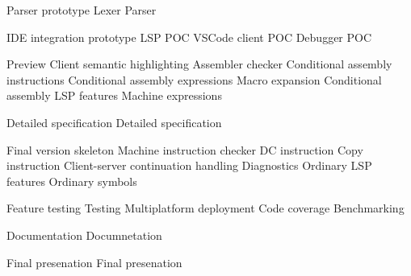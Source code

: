 	\itemm Parser prototype 
		\bwp
			\itemwp Lexer 
			\itemwp Parser 
		\eenum
	
	\itemm IDE integration prototype 
		\bwp
			\itemwp LSP POC 
			\itemwp VSCode client POC 
			\itemwp Debugger POC 
		\eenum
	
	\itemm \label{milestone_preview} Preview 
		\bwp
			\itemwp Client semantic highlighting 
			\itemwp Assembler checker 
			\itemwp Conditional assembly instructions 
			\itemwp Conditional assembly expressions 
			\itemwp Macro expansion 
			\itemwp Conditional assembly LSP features 
			\itemwp Machine expressions 
		\eenum
	
	\itemm Detailed specification 
		\bwp
			\itemwp Detailed specification 
		\eenum
	
	\itemm Final version skeleton 
		\bwp
			\itemwp Machine instruction checker 
			\itemwp DC instruction 
			\itemwp Copy instruction 
			\itemwp Client-server continuation handling 
			\itemwp Diagnostics 
			\itemwp Ordinary LSP features 
			\itemwp Ordinary symbols 
		\eenum
	
	\itemm Feature testing 
		\bwp
			\itemwp Testing 
			\itemwp Multiplatform deployment 
			\itemwp Code coverage 
			\itemwp Benchmarking 
		\eenum
	
	\itemm Documentation 
		\bwp
			\itemwp Documnetation 
		\eenum
	
	\itemm Final presenation 
		\bwp
			\itemwp Final presenation 
		\eenum
\eenum

